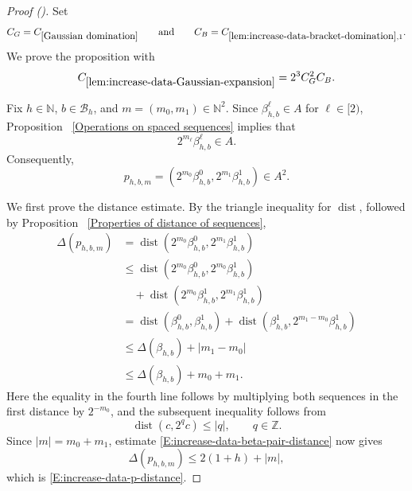\documentclass[12pt,reqno]{amsart}
\newcommand{\auto}{{({\tiny\faCar})}}
\theoremstyle{plain}
\numberwithin{equation}{section}
\theoremstyle{remark}
\DeclareMathOperator{\dist}{dist}
\newcommand{\jr}[1]{{\color{orange}{[J: #1]}}}
\begin{document}
\begin{proof}[Proof \auto]
Set
\[
C_G=C_{\ref{Gaussian domination}}
\qquad\text{and}\qquad
C_B=C_{\ref{lem:increase-data-bracket-domination},1}.
\]
We prove the proposition with
\begin{equation}
    \label{E:increase-data-Gaussian-expansion-constant}
    C_{\ref{lem:increase-data-Gaussian-expansion}}
    =
    2^3C_G^2C_B.
\end{equation}

Fix \(h\in\mathbb N\), \(b\in\mathcal B_h\), and
\(m=(m_0,m_1)\in\mathbb N^2\). Since
\(\beta_{h,b}^\ell\in A\) for \(\ell\in[2)\), Proposition~
\ref{Operations on spaced sequences} implies that
\[
2^{m_\ell}\beta_{h,b}^\ell\in A.
\]
Consequently,
\[
p_{h,b,m}
=
\left(
2^{m_0}\beta_{h,b}^0,
2^{m_1}\beta_{h,b}^1
\right)
\in A^2.
\]

We first prove the distance estimate. By the triangle inequality
for \(\dist\), followed by Proposition~
\ref{Properties of distance of sequences},\jr{GPT: Here you used aligned environment. You are not allowed to use this or other multiline environments. Use simple multiple single line displays instead.}
\[
\begin{aligned}
\Delta(p_{h,b,m})
&=
\dist\left(
2^{m_0}\beta_{h,b}^0,
2^{m_1}\beta_{h,b}^1
\right)
\\
&\leq
\dist\left(
2^{m_0}\beta_{h,b}^0,
2^{m_0}\beta_{h,b}^1
\right)
\\
&\quad+
\dist\left(
2^{m_0}\beta_{h,b}^1,
2^{m_1}\beta_{h,b}^1
\right)
\\
&=
\dist\left(
\beta_{h,b}^0,
\beta_{h,b}^1
\right)
+
\dist\left(
\beta_{h,b}^1,
2^{m_1-m_0}\beta_{h,b}^1
\right)
\\
&\leq
\Delta(\beta_{h,b})
+
|m_1-m_0|
\\
&\leq
\Delta(\beta_{h,b})
+
m_0+m_1.
\end{aligned}
\]
Here the equality in the fourth line follows by multiplying both
sequences in the first distance by \(2^{-m_0}\), and the subsequent
inequality follows from
\[
\dist(c,2^qc)\leq |q|,
\qquad q\in\mathbb Z.
\]
Since \(|m|=m_0+m_1\), estimate
\eqref{E:increase-data-beta-pair-distance} now gives
\[
\Delta(p_{h,b,m})
\leq
2(1+h)
+
|m|,
\]
which is \eqref{E:increase-data-p-distance}.


\end{proof}
\end{document}
